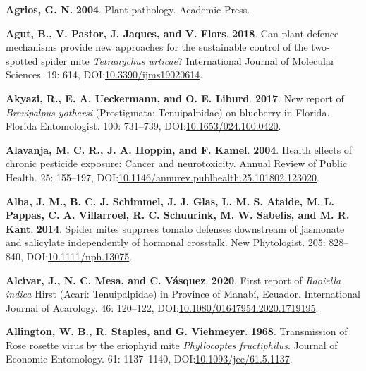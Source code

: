 \documentclass[12pt,final,CPage]{ufthesis}
\newlength{\cslhangindent}
\newenvironment{CSLReferences}[2] %
{%
	\setlength{\parindent}{0pt}
	\ifodd #1 \everypar{\setlength{\hangindent}{\cslhangindent}}\ignorespaces\fi
	\ifnum #2 > 0
	\setlength{\parskip}{#2\baselineskip}
	\fi
}%
{}
\begin{document}
{\begin{CSLReferences}{1}{0}
  \leavevmode{}%
  \textbf{Agrios, G. N.} \textbf{2004}. Plant pathology. Academic Press.

  \leavevmode{}%
  \textbf{Agut, B., V. Pastor, J. Jaques, and V. Flors}. \textbf{2018}. Can plant defence mechanisms provide new approaches for the sustainable control of the two-spotted spider mite {\emph{Tetranychus urticae}}? International Journal of Molecular Sciences. 19: 614, DOI:\href{https://doi.org/10.3390/ijms19020614}{10.3390/ijms19020614}.

  \leavevmode{}%
  \textbf{Akyazi, R., E. A. Ueckermann, and O. E. Liburd}. \textbf{2017}. New report of {\emph{Brevipalpus yothersi}} ({Prostigmata}: {Tenuipalpidae}) on blueberry in {Florida}. Florida Entomologist. 100: 731--739, DOI:\href{https://doi.org/10.1653/024.100.0420}{10.1653/024.100.0420}.

  \leavevmode{}%
  \textbf{Alavanja, M. C. R., J. A. Hoppin, and F. Kamel}. \textbf{2004}. Health effects of chronic pesticide exposure: Cancer and neurotoxicity. Annual Review of Public Health. 25: 155--197, DOI:\href{https://doi.org/10.1146/annurev.publhealth.25.101802.123020}{10.1146/annurev.publhealth.25.101802.123020}.

  \leavevmode{}%
  \textbf{Alba, J. M., B. C. J. Schimmel, J. J. Glas, L. M. S. Ataide, M. L. Pappas, C. A. Villarroel, R. C. Schuurink, M. W. Sabelis, and M. R. Kant}. \textbf{2014}. Spider mites suppress tomato defenses downstream of jasmonate and salicylate independently of hormonal crosstalk. New Phytologist. 205: 828--840, DOI:\href{https://doi.org/10.1111/nph.13075}{10.1111/nph.13075}.

  \leavevmode{}%
  \textbf{Alcı́var, J., N. C. Mesa, and C. Vásquez}. \textbf{2020}. First report of {\emph{Raoiella indica}} {Hirst} ({Acari}: {Tenuipalpidae}) in {Province} of {Manab{í}}, {Ecuador}. International Journal of Acarology. 46: 120--122, DOI:\href{https://doi.org/10.1080/01647954.2020.1719195}{10.1080/01647954.2020.1719195}.

  \leavevmode{}%
  \textbf{Allington, W. B., R. Staples, and G. Viehmeyer}. \textbf{1968}. Transmission of {Rose rosette virus} by the eriophyid mite {\emph{Phyllocoptes fructiphilus}}. Journal of Economic Entomology. 61: 1137--1140, DOI:\href{https://doi.org/10.1093/jee/61.5.1137}{10.1093/jee/61.5.1137}.


\end{CSLReferences}}
\end{document}

